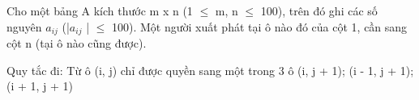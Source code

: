 Cho một bảng A kích thước m x n (1  $\le$  m, n  $\le$  100), trên đó ghi các số nguyên $a_{ij}$   (|$a_{ij}$   |  $\le$  100). Một người xuất phát tại ô nào đó của cột 1, cần sang cột n (tại ô nào cũng được).  

   Quy tắc đi: Từ ô (i, j) chỉ được quyền sang một trong 3 ô (i, j + 1); (i - 1, j + 1); (i + 1, j + 1)